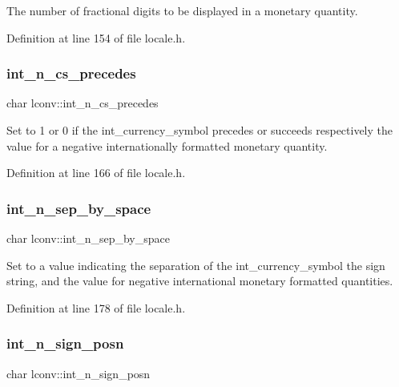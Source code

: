 The number of fractional digits to be displayed in a monetary quantity. 



Definition at line 154 of file locale.\+h.

\mbox{\label{structlconv_a36121c68c5571e40145365dd1edecbb7}} 
\subsubsection{\texorpdfstring{int\_n\_cs\_precedes}{int\_n\_cs\_precedes}}
{\footnotesize\ttfamily char lconv\+::int\+\_\+n\+\_\+cs\+\_\+precedes}



Set to 1 or 0 if the int\+\_\+currency\+\_\+symbol precedes or succeeds respectively the value for a negative internationally formatted monetary quantity. 



Definition at line 166 of file locale.\+h.

\mbox{\label{structlconv_ad9cfa63e25f4a2aa02f6c7ca540177a2}} 
\subsubsection{\texorpdfstring{int\_n\_sep\_by\_space}{int\_n\_sep\_by\_space}}
{\footnotesize\ttfamily char lconv\+::int\+\_\+n\+\_\+sep\+\_\+by\+\_\+space}



Set to a value indicating the separation of the int\+\_\+currency\+\_\+symbol the sign string, and the value for negative international monetary formatted quantities. 



Definition at line 178 of file locale.\+h.

\mbox{\label{structlconv_a642a9096f724fad40fe9f1711e92b323}} 
\subsubsection{\texorpdfstring{int\_n\_sign\_posn}{int\_n\_sign\_posn}}
{\footnotesize\ttfamily char lconv\+::int\+\_\+n\+\_\+sign\+\_\+posn}



